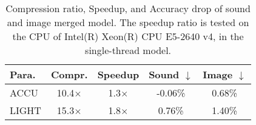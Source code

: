 \documentclass{article}
\begin{document}
	
	\begin{table}[t]
		\centering
		\small
		\caption{Compression ratio, Speedup, and Accuracy drop of sound and image merged model. The speedup ratio is tested on the CPU of Intel(R) Xeon(R) CPU E5-2640 v4, in the single-thread model. %
		}
		\label{LeNetMerge}
		\begin{tabular}{lcccc}
			\toprule
			Para.   & Compr.      & Speedup                 & Sound $\downarrow$            & Image $\downarrow$  \\ \hline
			ACCU       & 10.4$\times$   & 1.3$\times$     & -0.06\%                   & 0.68\%      \\
			LIGHT       & 15.3$\times$   & 1.8$\times$    & 0.76\%                    & 1.40\%     \\
			\bottomrule
		\end{tabular}
	\end{table}
	
	\begin{comment}
	\begin{table}[t]
	\centering
	\small
	\caption{Compression ratio, Speedup, and Accuracy drop of sound and image merged model. The speedup ratio is tested on both Intel and ARM device. One is the CPU of Intel(R) Xeon(R) CPU E5-2640 v4, and the other is CPU of NVIDIA Jetson TX1. ``$a/b$" in the Speedup field denotes the speedup ratio using different CPUs.%
	}
	\label{LeNetMerge}
	\begin{tabular}{lcccc}
	\toprule
	Para.   & Compr.      & Speedup                 & Sound $\downarrow$            & Image $\downarrow$  \\ \hline
	ACCU       & 10.4 $\times$   & 1.3$/$4.2 $\times$     & -0.06\%                   & 0.68\%      \\
	LIGHT       & 15.3 $\times$   & 1.8$/$6.2 $\times$    & 0.76\%                    & 1.40\%     \\
	\bottomrule
	\end{tabular}
	\end{table}
	\end{comment}
	
\end{document}
